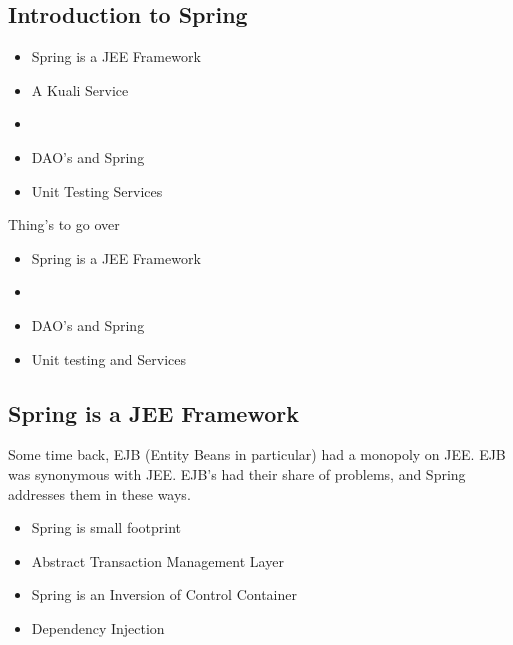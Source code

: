 \begin{ifhtml}
  \begin{s5slide}
    \section{Introduction to Spring}
    \begin{itemize}
      \item Spring is a JEE Framework
      \item A Kuali Service
      \item {}
      \item DAO's and Spring
      \item Unit Testing Services
    \end{itemize}

    \begin{s5notes}
      Thing's to go over
      \begin{itemize}
      \item Spring is a JEE Framework
      \item {}
      \item DAO's and Spring
      \item Unit testing and Services        
      \end{itemize}
    \end{s5notes} 
  \end{s5slide}

  \begin{s5slide}
    \section{Spring is a JEE Framework}
    Some time back, EJB (Entity Beans in particular) had a monopoly on JEE. EJB was synonymous with JEE. EJB's had their share of 
    problems, and Spring addresses them in these ways.
    \begin{itemize}
      \item Spring is small footprint
      \item Abstract Transaction Management Layer
      \item Spring is an Inversion of Control Container
      \item Dependency Injection
    \end{itemize}


\end{s5slide}
\end{ifhtml}
